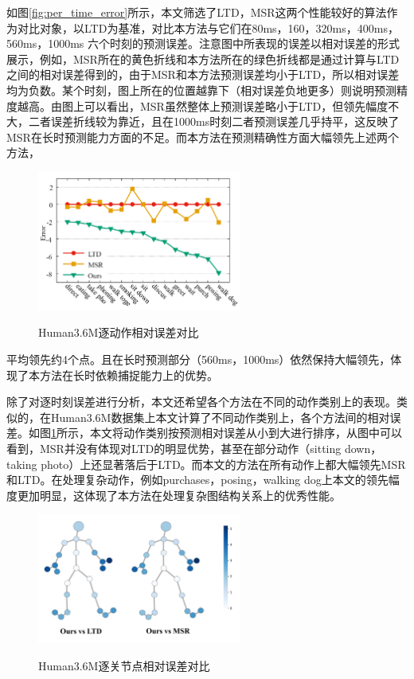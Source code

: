 如图\ref{fig:per_time_error}所示，本文筛选了LTD，MSR这两个性能较好的算法作为对比对象，以LTD为基准，对比本方法与它们在80ms，160，320ms，400ms，560ms，1000ms 六个时刻的预测误差。注意图中所表现的误差以相对误差的形式展示，例如，MSR所在的黄色折线和本方法所在的绿色折线都是通过计算与LTD之间的相对误差得到的，由于MSR和本方法预测误差均小于LTD，所以相对误差均为负数。某个时刻，图上所在的位置越靠下（相对误差负地更多）则说明预测精度越高。由图上可以看出，MSR虽然整体上预测误差略小于LTD，但领先幅度不大，二者误差折线较为靠近，且在1000ms时刻二者预测误差几乎持平，这反映了MSR在长时预测能力方面的不足。而本方法在预测精确性方面大幅领先上述两个方法，
\begin{figure}[h]
    \centering
    \includegraphics[width=0.60\textwidth]{FigMa/per_action.png}\\
    \vspace{-0.3cm}
    \caption{Human3.6M逐动作相对误差对比}
    \label{fig:per_action_error}
\end{figure}
平均领先约4个点。且在长时预测部分（560ms，1000ms）依然保持大幅领先，体现了本方法在长时依赖捕捉能力上的优势。


除了对逐时刻误差进行分析，本文还希望各个方法在不同的动作类别上的表现。类似的，在Human3.6M数据集上本文计算了不同动作类别上，各个方法间的相对误差。如图\ref{fig:per_action_error}所示，本文将动作类别按预测相对误差从小到大进行排序，从图中可以看到，MSR并没有体现对LTD的明显优势，甚至在部分动作（sitting down，taking photo）上还显著落后于LTD。而本文的方法在所有动作上都大幅领先MSR和LTD。在处理复杂动作，例如purchases，posing，walking dog上本文的领先幅度更加明显，这体现了本方法在处理复杂图结构关系上的优秀性能。

\begin{figure}[ht]
    \centering
    \includegraphics[width=0.60\textwidth]{FigMa/per_joint.png}\\
    \vspace{-0.3cm}
    \caption{Human3.6M逐关节点相对误差对比}
    \label{fig:per_joint_error}
\end{figure}

